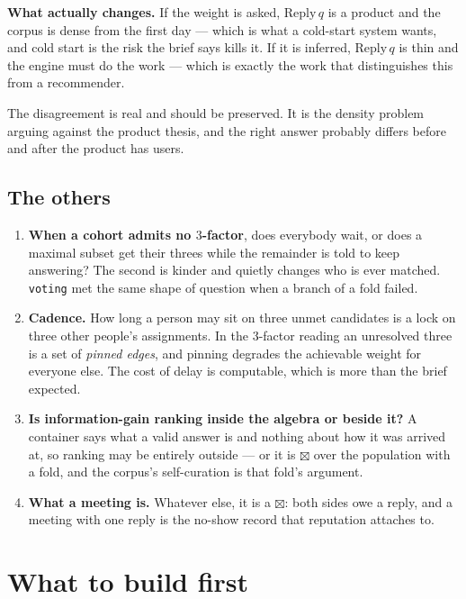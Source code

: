 \documentclass[11pt,a4paper]{article}
\newcommand{\ten}{\mathbin{\boxtimes}}
\newcommand{\Reply}{\mathrm{Reply}}
\begin{document}
\textbf{What actually changes.} If the weight is asked, $\Reply\,q$ is a product
and the corpus is dense from the first day --- which is what a cold-start system
wants, and cold start is the risk the brief says kills it. If it is inferred,
$\Reply\,q$ is thin and the engine must do the work --- which is exactly the work
that distinguishes this from a recommender.

\begin{notebox}
The disagreement is real and should be preserved. It is the density problem
arguing against the product thesis, and the right answer probably differs before
and after the product has users.
\end{notebox}

\subsection{The others}

\begin{enumerate}
\item \textbf{When a cohort admits no $3$-factor}, does everybody wait, or does a
  maximal subset get their threes while the remainder is told to keep answering?
  The second is kinder and quietly changes who is ever matched. \texttt{voting}
  met the same shape of question when a branch of a fold failed.
\item \textbf{Cadence.} How long a person may sit on three unmet candidates is a
  lock on three other people's assignments. In the $3$-factor reading an
  unresolved three is a set of \emph{pinned edges}, and pinning degrades the
  achievable weight for everyone else. The cost of delay is computable, which is
  more than the brief expected.
\item \textbf{Is information-gain ranking inside the algebra or beside it?} A
  container says what a valid answer is and nothing about how it was arrived at,
  so ranking may be entirely outside --- or it is $\ten$ over the population with
  a fold, and the corpus's self-curation is that fold's argument.
\item \textbf{What a meeting is.} Whatever else, it is a $\ten$: both sides owe a
  reply, and a meeting with one reply is the no-show record that reputation
  attaches to.
\end{enumerate}

\section{What to build first}
\end{document}
